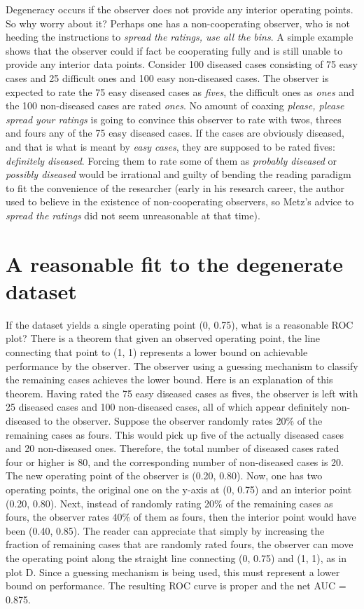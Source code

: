 \documentclass[
]{book}
\begin{document}
Degeneracy occurs if the observer does not provide any interior operating points. So why worry about it? Perhaps one has a non-cooperating observer, who is not heeding the instructions to \emph{spread the ratings, use all the bins}. A simple example shows that the observer could if fact be cooperating fully and is still unable to provide any interior data points. Consider 100 diseased cases consisting of 75 easy cases and 25 difficult ones and 100 easy non-diseased cases. The observer is expected to rate the 75 easy diseased cases as \emph{fives}, the difficult ones as \emph{ones} and the 100 non-diseased cases are rated \emph{ones}. No amount of coaxing \emph{please, please spread your ratings} is going to convince this observer to rate with twos, threes and fours any of the 75 easy diseased cases. If the cases are obviously diseased, and that is what is meant by \emph{easy cases}, they are supposed to be rated fives: \emph{definitely diseased}. Forcing them to rate some of them as \emph{probably diseased} or \emph{possibly diseased} would be irrational and guilty of bending the reading paradigm to fit the convenience of the researcher (early in his research career, the author used to believe in the existence of non-cooperating observers, so Metz's advice to \emph{spread the ratings} did not seem unreasonable at that time).

\hypertarget{a-reasonable-fit-to-the-degenerate-dataset}{%
\section{A reasonable fit to the degenerate dataset}\label{a-reasonable-fit-to-the-degenerate-dataset}}

If the dataset yields a single operating point (0, 0.75), what is a reasonable ROC plot? There is a theorem that given an observed operating point, the line connecting that point to (1, 1) represents a lower bound on achievable performance by the observer. The observer using a guessing mechanism to classify the remaining cases achieves the lower bound. Here is an explanation of this theorem. Having rated the 75 easy diseased cases as fives, the observer is left with 25 diseased cases and 100 non-diseased cases, all of which appear definitely non-diseased to the observer. Suppose the observer randomly rates 20\% of the remaining cases as fours. This would pick up five of the actually diseased cases and 20 non-diseased ones. Therefore, the total number of diseased cases rated four or higher is 80, and the corresponding number of non-diseased cases is 20. The new operating point of the observer is (0.20, 0.80). Now, one has two operating points, the original one on the y-axis at (0, 0.75) and an interior point (0.20, 0.80). Next, instead of randomly rating 20\% of the remaining cases as fours, the observer rates 40\% of them as fours, then the interior point would have been (0.40, 0.85). The reader can appreciate that simply by increasing the fraction of remaining cases that are randomly rated fours, the observer can move the operating point along the straight line connecting (0, 0.75) and (1, 1), as in plot D. Since a guessing mechanism is being used, this must represent a lower bound on performance. The resulting ROC curve is proper and the net AUC = 0.875.
\end{document}
